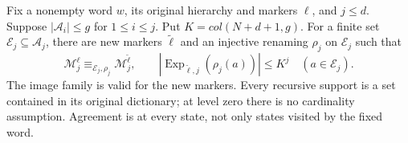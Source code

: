\begin{lemma}\label{lem:simultaneous-compression}
Fix a nonempty word $w$, its original hierarchy and markers
$\boldsymbol\ell$, and $j\le d$. Suppose $|\mathcal A_i|\le g$ for
$1\le i\le j$. Put $K=\mathit{col}(N+d+1,g)$. For a finite set
$\mathcal E_j\subseteq\mathcal A_j$, there are new markers
$\widetilde{\boldsymbol\ell}$ and an injective renaming $\rho_j$ on $\mathcal E_j$
such that
\[
 \mathcal M^{\boldsymbol\ell}_j
 \equiv_{\mathcal E_j,\rho_j}\mathcal M^{\widetilde{\boldsymbol\ell}}_j,
 \qquad
 |\operatorname{Exp}_{\widetilde{\boldsymbol\ell},j}(\rho_j(a))|
 \le K^j\quad(a\in \mathcal E_j).
\]
The image family is valid for the new markers. Every recursive support
is a set contained in its original dictionary; at level zero there is no
cardinality assumption. Agreement is at every state, not only states
visited by the fixed word.
\end{lemma}
